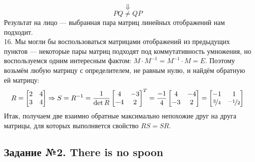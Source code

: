 \documentclass[a3paper,14pt]{extarticle}
\begin{document}
$$\Downarrow$$
$$PQ \neq QP$$
Результат на лицо --- выбранная пара матриц линейных отображений нам подходит.\\[1.5em]
16. Мы могли бы воспользоваться матрицами отображений из предыдущих пунктов --- некоторые пары матриц подходят под коммутативность умножения, но воспользуемся одним интересным фактом: $M\cdot M^{-1}=M^{-1}\cdot M=E$. Поэтому возьмём любую матрицу с определителем, не равным нулю, и найдём обратную ей матрицу:
$$R = \begin{bmatrix}
    2 & 4 \\ 3 & 4
\end{bmatrix} \Rightarrow S = R^{-1} = \frac{1}{\det{R}}\begin{bmatrix}
    4 & -3 \\ -4 & 2
\end{bmatrix}^T = \frac{-1}{4}\begin{bmatrix}
    4 & -4 \\ -3 & 2
\end{bmatrix} = \begin{bmatrix}
    -1 & 1 \\ \nicefrac{3}{4} & \nicefrac{-1}{2}
\end{bmatrix}$$
Итак, получаем две взаимно обратные максимально непохожие друг на друга матрицы, для которых выполняется свойство $RS = SR$.
\subsection*{\centering Задание №2. There is no spoon}
\end{document}

